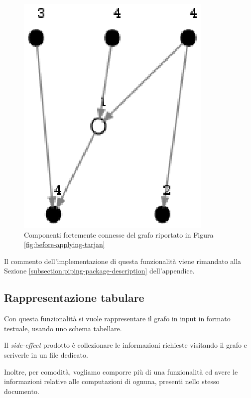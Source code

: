 \begin{figure}
  \centering
  \includegraphics{images/OnePipingLevelUnitTest_Printer_DFS_PrinterPipe_Crescenzi-phase-PrinterPipeFilter-level-2.eps}
  \caption{Componenti fortemente connesse del grafo riportato in
    Figura \ref{fig:before-applying-tarjan}}
  \label{fig:tarjan-output}
\end{figure}

Il commento dell'implementazione di questa funzionalit\`a viene
rimandato alla Sezione \ref{subsection:piping-package-description}
dell'appendice.

\subsection{Rappresentazione tabulare}
Con questa funzionalit\`a si vuole rappresentare il grafo in input in
formato testuale, usando uno schema tabellare.

Il \emph{side-effect} prodotto \`e collezionare le informazioni
richieste visitando il grafo e scriverle in un file dedicato.

Inoltre, per comodit\`a, vogliamo comporre pi\`u di una funzionalit\`a
ed avere le informazioni relative alle computazioni di ognuna,
presenti nello stesso documento.

